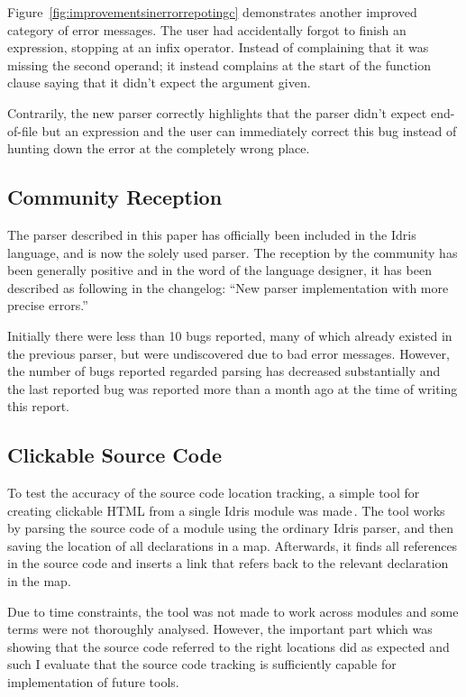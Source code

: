 \documentclass[a4paper]{article}%
\begin{document}
Figure~\ref{fig:improvementsinerrorrepotingc} demonstrates another improved category of error messages. The user had accidentally
forgot to finish an expression, stopping at an infix operator. Instead of complaining that it was missing the second operand; it instead complains at the start of the function
clause saying that it didn't expect the argument given.

Contrarily, the new parser correctly highlights that the parser didn't expect end-of-file but an expression and the user can immediately correct this bug instead
of hunting down the error at the completely wrong place.

\subsection{Community Reception}
\label{sub:CommunityReception}
The parser described in this paper has officially been included in the Idris language, and is now the solely used parser.
The reception by the community has been generally positive and in the word of the language designer, it has been described as following in the changelog: ``New parser implementation with more precise errors.''

Initially there were less than 10 bugs reported, many of which already existed in the previous parser, but were undiscovered due to bad error messages.
However, the number of bugs reported regarded parsing has decreased substantially and the last reported bug was reported more than a month ago at the time of writing this report.

\subsection{Clickable Source Code}
\label{sub:ClickableSourceCode}
To test the accuracy of the source code location tracking, a simple tool for creating clickable HTML from a single Idris module was made\,\cite{alsibahi2013clickablesource}.
The tool works by parsing the source code of a module using the ordinary Idris parser, and then saving the location of all declarations in a map.
Afterwards, it finds all references in the source code and inserts a link that refers back to the relevant declaration in the map.

Due to time constraints, the tool was not made to work across modules and some terms were not thoroughly analysed. However, the important part which was showing that
the source code referred to the right locations did as expected and such I evaluate that the source code tracking is sufficiently capable for implementation of future tools.
\end{document}
